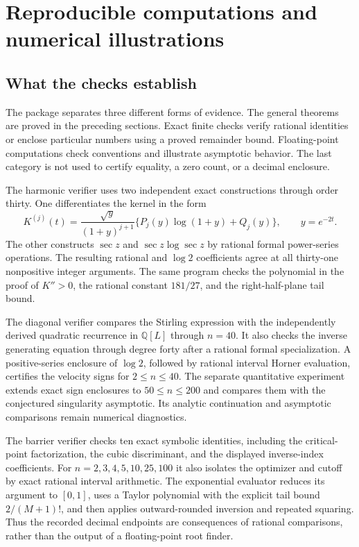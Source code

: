 \section{Reproducible computations and numerical illustrations}
\label{sec:computations}

\subsection{What the checks establish}

The package separates three different forms of evidence.
The general theorems are proved in the preceding sections.
Exact finite checks verify rational identities or enclose particular
numbers using a proved remainder bound. Floating-point computations
check conventions and illustrate asymptotic behavior. The last category
is not used to certify equality, a zero count, or a decimal enclosure.

The harmonic verifier uses two independent exact constructions through
order thirty. One differentiates the kernel in the form
\[
 K^{(j)}(t)=
 \frac{\sqrt y}{(1+y)^{j+1}}
 \{P_j(y)\log(1+y)+Q_j(y)\},\qquad y=e^{-2t}.
\]
The other constructs $\sec z$ and
$\sec z\log\sec z$ by rational formal power-series operations.
The resulting rational and $\log2$ coefficients agree at all thirty-one
nonpositive integer arguments. The same program checks the polynomial
in the proof of $K''>0$, the rational constant $181/27$, and the
right-half-plane tail bound.

The diagonal verifier compares the Stirling expression with the
independently derived quadratic recurrence in $\mathbb Q[L]$
through $n=40$. It also checks the inverse generating equation
through degree forty after a rational formal specialization.
A positive-series enclosure of $\log2$, followed by rational interval
Horner evaluation, certifies the velocity signs for $2\le n\le40$.
The separate quantitative experiment extends exact sign enclosures
to $50\le n\le200$ and compares them with the conjectured singularity
asymptotic. Its analytic continuation and asymptotic comparisons remain
numerical diagnostics.

The barrier verifier checks ten exact symbolic identities, including
the critical-point factorization, the cubic discriminant, and the displayed
inverse-index coefficients. For $n=2,3,4,5,10,25,100$ it also isolates
the optimizer and cutoff by exact rational interval arithmetic.
The exponential evaluator reduces its argument to $[0,1]$,
uses a Taylor polynomial with the explicit tail bound
$2/(M+1)!$, and then applies outward-rounded inversion and repeated
squaring. Thus the recorded decimal endpoints are consequences of
rational comparisons, rather than the output of a floating-point
root finder.

